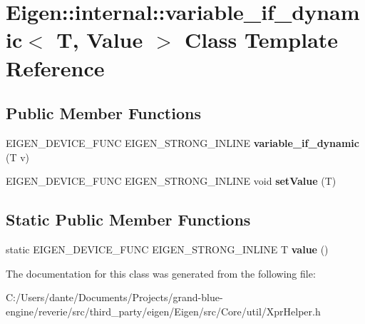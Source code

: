 \hypertarget{class_eigen_1_1internal_1_1variable__if__dynamic}{}\section{Eigen\+::internal\+::variable\+\_\+if\+\_\+dynamic$<$ T, Value $>$ Class Template Reference}
\label{class_eigen_1_1internal_1_1variable__if__dynamic}
\subsection*{Public Member Functions}
\begin{DoxyCompactItemize}
\item 
\mbox{\label{class_eigen_1_1internal_1_1variable__if__dynamic_abecde4c7d817c80ac0dd0132b5e931d4}} 
E\+I\+G\+E\+N\+\_\+\+D\+E\+V\+I\+C\+E\+\_\+\+F\+U\+NC E\+I\+G\+E\+N\+\_\+\+S\+T\+R\+O\+N\+G\+\_\+\+I\+N\+L\+I\+NE {\bfseries variable\+\_\+if\+\_\+dynamic} (T v)
\item 
\mbox{\label{class_eigen_1_1internal_1_1variable__if__dynamic_accea2b8ca20ab0ff9264ef8e7d70cb2e}} 
E\+I\+G\+E\+N\+\_\+\+D\+E\+V\+I\+C\+E\+\_\+\+F\+U\+NC E\+I\+G\+E\+N\+\_\+\+S\+T\+R\+O\+N\+G\+\_\+\+I\+N\+L\+I\+NE void {\bfseries set\+Value} (T)
\end{DoxyCompactItemize}
\subsection*{Static Public Member Functions}
\begin{DoxyCompactItemize}
\item 
\mbox{\label{class_eigen_1_1internal_1_1variable__if__dynamic_a1bb2387fda14c673bc6b0004f6849f84}} 
static E\+I\+G\+E\+N\+\_\+\+D\+E\+V\+I\+C\+E\+\_\+\+F\+U\+NC E\+I\+G\+E\+N\+\_\+\+S\+T\+R\+O\+N\+G\+\_\+\+I\+N\+L\+I\+NE T {\bfseries value} ()
\end{DoxyCompactItemize}


The documentation for this class was generated from the following file\+:\begin{DoxyCompactItemize}
\item 
C\+:/\+Users/dante/\+Documents/\+Projects/grand-\/blue-\/engine/reverie/src/third\+\_\+party/eigen/\+Eigen/src/\+Core/util/Xpr\+Helper.\+h\end{DoxyCompactItemize}
